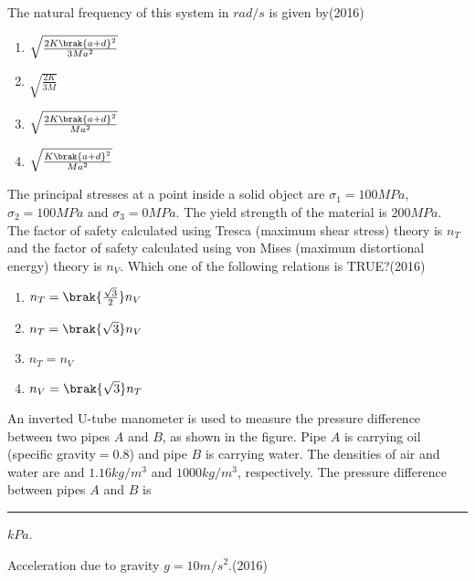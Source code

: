 The natural frequency of this system in $rad/s$ is given by\hfill(2016)
\begin{multicols}{2}
\begin{enumerate}
\item $\sqrt{\frac{2K\brak{a+d}^{2}}{3Ma^{2}}}$
\item $\sqrt{\frac{2K}{3M}}$
\item $\sqrt{\frac{2K\brak{a+d}^{2}}{Ma^{2}}}$
\item $\sqrt{\frac{K\brak{a+d}^{2}}{Ma^{2}}}$
\end{enumerate}
\end{multicols}


\item The principal stresses at a point inside a solid object are $\sigma_{1}=100MPa$, $\sigma_{2}=100 MPa$ and $\sigma_{3}=0MPa$. The yield strength of the material is $200MPa$. The factor of safety calculated using Tresca (maximum shear stress) theory is $n_{T}$ and the factor of safety calculated using von Mises (maximum distortional energy) theory is $n_{V}$. Which one of the following relations is TRUE?\hfill(2016)
\begin{multicols}{2}
\begin{enumerate}
\item $n_{T}=\brak{\frac{\sqrt{3}}{2}}n_{V}$
\item $n_{T}=\brak{\sqrt{3}}n_{V}$
\item $n_{T}=n_{V}$
\item $n_{V}=\brak{\sqrt{3}}n_{T}$
\end{enumerate}
\end{multicols}


\item An inverted U-tube manometer is used to measure the pressure difference between two pipes $A$ and $B$, as shown in the figure. Pipe $A$ is carrying oil (specific gravity$=0.8$) and pipe $B$ is carrying water. The densities of air and water are and $1.16kg/m^{3}$ and $1000kg/m^{3}$, respectively. The pressure difference between pipes $A$ and $B$ is \rule{1cm}{0.15mm} $kPa$.

Acceleration due to gravity $g=10m/s^{2}$.\hfill(2016)


